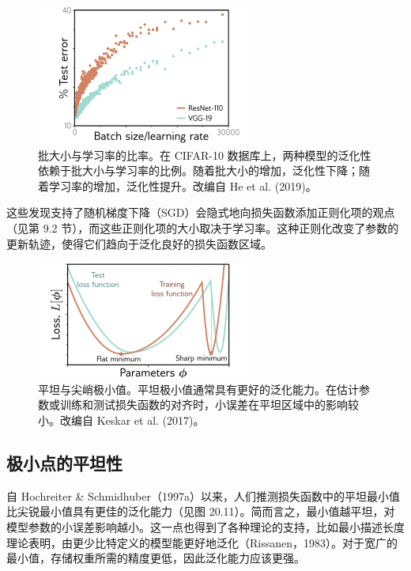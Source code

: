 \begin{figure}[ht!]
\centering
\includegraphics[width=0.7\linewidth]{png/chapter20/WhyBatchSizeLearningRate.png}
\caption{批大小与学习率的比率。在 CIFAR-10 数据库上，两种模型的泛化性依赖于批大小与学习率的比例。随着批大小的增加，泛化性下降；随着学习率的增加，泛化性提升。改编自 He et al. (2019)。}
\end{figure}

这些发现支持了随机梯度下降（SGD）会隐式地向损失函数添加正则化项的观点（见第 9.2 节），而这些正则化项的大小取决于学习率。这种正则化改变了参数的更新轨迹，使得它们趋向于泛化良好的损失函数区域。

\begin{figure}[ht!]
\centering
\includegraphics[width=0.7\linewidth]{png/chapter20/WhyFlatness.png}
\caption{平坦与尖峭极小值。平坦极小值通常具有更好的泛化能力。在估计参数或训练和测试损失函数的对齐时，小误差在平坦区域中的影响较小。改编自 Keskar et al. (2017)。}
\end{figure}

\subsection{极小点的平坦性}
自 Hochreiter \& Schmidhuber（1997a）以来，人们推测损失函数中的平坦最小值比尖锐最小值具有更佳的泛化能力（见图 20.11）。简而言之，最小值越平坦，对模型参数的小误差影响越小。这一点也得到了各种理论的支持，比如最小描述长度理论表明，由更少比特定义的模型能更好地泛化（Rissanen，1983）。对于宽广的最小值，存储权重所需的精度更低，因此泛化能力应该更强。

